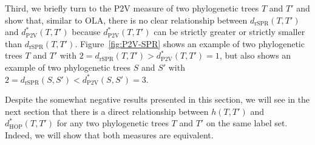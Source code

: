 \documentclass{article}
\newcommand{\rSPR}{\mathrm{rSPR}}
\newcommand{\HOP}{\mathrm{HOP}}
\newcommand{\PV}{\mathrm{P2V}}
\begin{document}
Third, we briefly turn to the $\PV$ measure of two phylogenetic trees $T$ and $T'$ and show that, similar to OLA, there is no clear relationship between $d_\rSPR(T,T')$ and $d_\PV^*(T,T')$ because $d_\PV^*(T,T')$ can be strictly greater or strictly smaller than $d_\rSPR(T,T')$. Figure~\ref{fig:P2V-SPR} shows an example of two phylogenetic trees $T$ and $T'$ with $2=d_\rSPR(T,T')>d_\PV^*(T,T')=1$, but also shows an example of two phylogenetic trees $S$ and $S'$ with $2=d_\rSPR(S,S')<d_\PV^*(S,S')=3$.

Despite the somewhat negative results presented in this section, we will see in the next section that there is a direct relationship between $h(T,T')$ and $d_\HOP^*(T,T')$ for any two phylogenetic trees $T$ and $T'$ on the same label set. Indeed, we will show that both measures are equivalent.
\end{document}
